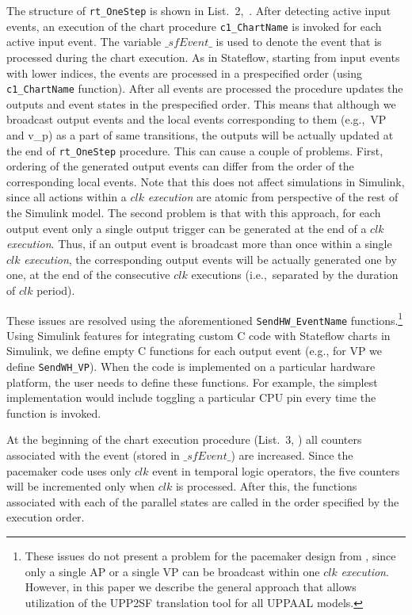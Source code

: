 The structure of \texttt{rt\_OneStep} is shown in List.~2,~. After detecting active input events, an execution of the chart procedure \texttt{c1\_ChartName} is invoked for each active input event. The variable $\_sfEvent\_$ is used to denote the event that is processed during the chart execution. As in Stateflow, starting from input events with lower indices, the events are processed in a prespecified order (using \texttt{c1\_ChartName} function). After all events are processed the procedure updates the outputs and event states in the prespecified order. This means that although we broadcast output events and the local events corresponding to them (e.g.,~VP and v\_p) as a part of same transitions, the outputs will be actually updated at the end of \texttt{rt\_OneStep} procedure. This can cause a couple of problems. First, ordering of the generated output events can differ from the order of the corresponding local events. Note that this does not affect simulations in Simulink, since all actions within a $clk$ \textit{execution} are atomic from perspective of the rest of the Simulink model. The second problem is that with this approach, for each output event only a single output trigger can be generated at the end of a $clk$ \textit{execution}. Thus, if an output event is broadcast more than once within a single $clk$ \textit{execution}, the corresponding output events will be actually generated one by one, at the end of the consecutive $clk$ executions (i.e.,~separated by the duration of $clk$ period).

These issues are resolved using the aforementioned \texttt{SendHW\_EventName} functions.\footnote{These issues do not present a problem for the pacemaker design from , since only a single AP or a single VP can be broadcast within one $clk$ \textit{execution}. However, in this paper we describe the general approach that allows utilization of the UPP2SF translation tool for all UPPAAL models.} Using Simulink features for integrating custom C code with Stateflow charts in Simulink, we define empty C functions for each output event (e.g., for VP we define \texttt{SendWH\_VP}). When the code is implemented on a particular hardware platform, the user needs to define these functions. For example, the simplest implementation would include toggling a particular CPU pin every time the function is invoked. 

At the beginning of the chart execution procedure (List.~3, ) all counters associated with the event (stored in $\_sfEvent\_$) are increased. Since the pacemaker code uses only $clk$ event in temporal logic operators, the five counters will be incremented only when $clk$ is processed. After this, the functions associated with each of the parallel states are called in the order specified by the execution order. 


